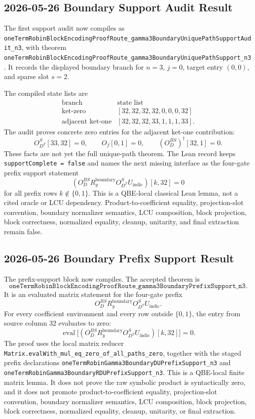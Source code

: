 \subsection{2026-05-26 Boundary Support Audit Result}

The first support audit now compiles as
\texttt{oneTermRobinBlockEncodingProofRoute\_gamma3BoundaryUniquePathSupportAudit\_n3},
with theorem
\texttt{oneTermRobinBlockEncodingProofRoute\_gamma3BoundaryUniquePathSupport\_n3}.
It records the displayed boundary branch for \(n=3\), \(j=0\), target entry
\((0,0)\), and sparse slot \(s=2\).

The compiled state lists are
\[
\begin{array}{c|c}
\text{branch} & \text{state list} \\
\hline
\text{ket-zero} & [32,32,32,32,0,0,0,32] \\
\text{adjacent ket-one} & [32,32,32,33,1,1,1,33].
\end{array}
\]
The audit proves concrete zero entries for the adjacent ket-one contribution:
\[
  O_{D^T}^{S}[33,32] = 0,\qquad
  O_f[0,1] = 0,\qquad
  (O_D^{BS})^\dagger[32,1] = 0.
\]
These facts are not yet the full unique-path theorem.  The Lean record keeps
\texttt{supportComplete = false} and names the next missing interface as the
four-gate prefix support statement
\[
  (O_D^{BS} R_y^{\mathrm{boundary}} O_{D^T}^{S} U_{\mathrm{indic}})[k,32] = 0
\]
for all prefix rows \(k \notin \{0,1\}\).  This is a QBE-local classical Lean
lemma, not a cited oracle or LCU dependency.  Product-to-coefficient equality,
projection-slot convention, boundary normalizer semantics, LCU composition,
block projection, block correctness, normalized equality, cleanup, unitarity,
and final extraction remain false.

\subsection{2026-05-26 Boundary Prefix Support Result}

The prefix-support block now compiles.  The accepted theorem is
\[
\texttt{oneTermRobinBlockEncodingProofRoute\_gamma3BoundaryPrefixSupport\_n3}.
\]
It is an evaluated matrix statement for the four-gate prefix
\[
  O_D^{BS} R_y^{\mathrm{boundary}} O_{D^T}^{S} U_{\mathrm{indic}}.
\]
For every coefficient environment and every row outside \(\{0,1\}\), the
entry from source column \(32\) evaluates to zero:
\[
  \operatorname{eval}
  \bigl[
    (O_D^{BS} R_y^{\mathrm{boundary}} O_{D^T}^{S} U_{\mathrm{indic}})[k,32]
  \bigr] = 0.
\]
The proof uses the local matrix reducer
\texttt{Matrix.evalWith\_mul\_eq\_zero\_of\_all\_paths\_zero}, together with
the staged prefix declarations
\texttt{oneTermRobinGamma3BoundaryDUPrefixSupport\_n3} and
\texttt{oneTermRobinGamma3BoundaryRDUPrefixSupport\_n3}.  This is a
QBE-local finite matrix lemma.  It does not prove the raw symbolic product is
syntactically zero, and it does not promote product-to-coefficient equality,
projection-slot convention, boundary normalizer semantics, LCU composition,
block projection, block correctness, normalized equality, cleanup, unitarity,
or final extraction.

